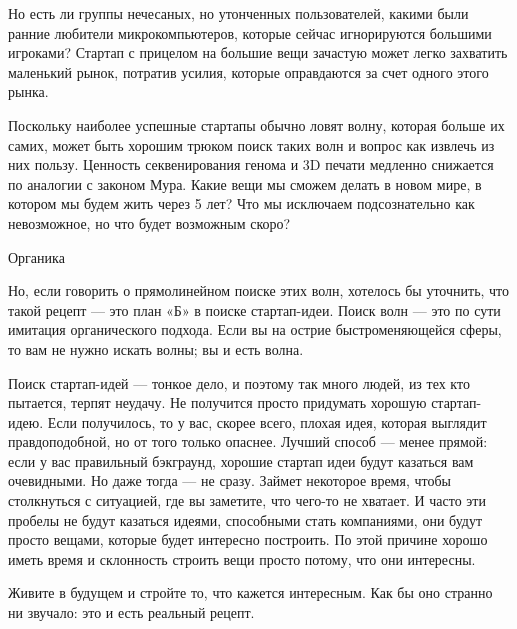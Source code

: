 \documentclass[ebook,12pt,oneside,openany]{memoir}
\begin{document}
Но есть ли группы нечесаных, но утонченных пользователей, какими были
ранние любители микрокомпьютеров, которые сейчас игнорируются большими
игроками? Стартап с прицелом на большие вещи зачастую может легко
захватить маленький рынок, потратив усилия, которые оправдаются за
счет одного этого рынка.

Поскольку наиболее успешные стартапы обычно ловят волну, которая
больше их самих, может быть хорошим трюком поиск таких волн и вопрос
как извлечь из них пользу. Ценность секвенирования генома и 3D печати
медленно снижается по аналогии с законом Мура. Какие вещи мы сможем
делать в новом мире, в котором мы будем жить через 5 лет? Что мы
исключаем подсознательно как невозможное, но что будет возможным
скоро?

Органика

Но, если говорить о прямолинейном поиске этих волн, хотелось бы
уточнить, что такой рецепт — это план «Б» в поиске стартап-идеи. Поиск
волн — это по сути имитация органического подхода. Если вы на острие
быстроменяющейся сферы, то вам не нужно искать волны; вы и есть волна.

Поиск стартап-идей — тонкое дело, и поэтому так много людей, из тех
кто пытается, терпят неудачу. Не получится просто придумать хорошую
стартап-идею. Если получилось, то у вас, скорее всего, плохая идея,
которая выглядит правдоподобной, но от того только опаснее. Лучший
способ — менее прямой: если у вас правильный бэкграунд, хорошие
стартап идеи будут казаться вам очевидными. Но даже тогда — не сразу.
Займет некоторое время, чтобы столкнуться с ситуацией, где вы
заметите, что чего-то не хватает. И часто эти пробелы не будут
казаться идеями, способными стать компаниями, они будут просто вещами,
которые будет интересно построить. По этой причине хорошо иметь время
и склонность строить вещи просто потому, что они интересны.

Живите в будущем и стройте то, что кажется интересным. Как бы оно
странно ни звучало: это и есть реальный рецепт.
\end{document}
